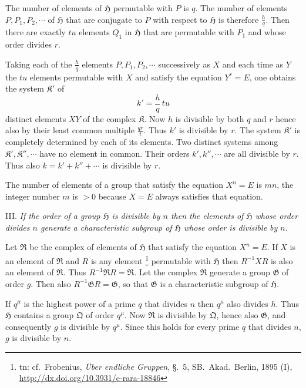 \documentclass[a5paper,12pt]{article}
\let\fr\mathfrak
\newcommand{\CG}{\fr{G}}
\newcommand{\CH}{\fr{H}}
\newcommand{\CK}{\fr{K}}
\newcommand{\CQ}{\fr{Q}}
\newcommand{\CR}{\fr{R}}
\newcommand{\?}{{\color{blue}${}^{(?)}$}}
\newcounter{origpagecounter}{}
\newcommand{\origpagebreak}{\mark{\arabic{origpagecounter}}\addtocounter{origpagecounter}{1}\mark{\arabic{origpagecounter}}}
\begin{document}
The number of elements of $\CH$
permutable with $P$ is $q$.
%
%
The number of elements $P, P_1, P_2, \cdots$
of $\CH$
that are conjugate to $P$
with respect to $\CH$
is therefore $\frac{h}{q}$.
%
%
Then there are exactly $t u$
elements $Q_1$ in $\CH$
that are permutable with $P_1$
and
whose order divides $r$.
%
%
\origpagebreak
%
%
Taking
each of the $\frac{h}{q}$ elements
$P, P_1, P_2, \cdots$
successively as $X$
and
each time
as $Y$
the $t u$ elements permutable with $X$
and
satisfy the equation $Y^r = E$,
one obtains
the system
$\CK'$
of %
\[
	k' = \frac{h}{q} \, t u
\]
distinct elements $X Y$ of the complex $\CK$.
%
%
Now $h$ is divisible
by both $q$ and $r$
hence
also by their
least common multiple $\frac{q r}{t}$.
%
%
Thus $k'$ is divisible by $r$.
%
%
The system $\CK'$
is completely determined
by each of its elements.
%
%
Two distinct systems
among $\CK', \CK'', \cdots$
have no element in common.
%
%
Their orders $k', k'', \cdots$
are all divisible by $r$.
%
%
Thus also $k = k' + k'' + \cdots$ is
divisible by $r$.


The number of elements of a group
that satisfy the equation $X^n = E$
is $m n$,
the integer number $m$ is $> 0$
because
$X = E$ always satisfies that equation.


III.
%
\label{t:2-3}
%
\emph{ %
If the order of a group $\CH$ is divisible by $n$
then
the elements of $\CH$
whose order divides $n$
generate
a characteristic subgroup
of $\CH$
whose order is divisible by $n$.
}


Let $\CR$ be the complex of elements of $\CH$
that satisfy the equation $X^n = E$.
%
%
If $X$ is an element of $\CR$
and $R$ is any element%
\footnote{%
	\scriptsize
	tn: cf.~Frobenius,
	\emph{\"Uber endliche Gruppen}, \S.~5,
	SB.~Akad.~Berlin,
	1895 (I),
	\href{http://dx.doi.org/10.3931/e-rara-18846}{http://dx.doi.org/10.3931/e-rara-18846}
}
permutable
with $\CH$
then
$R^{-1} X R$
is also an element of $\CR$.
%
%
Thus $R^{-1} \CR R = \CR$.
%
%
Let the complex $\CR$ generate a group $\CG$
of order $g$.
%
%
Then also $R^{-1} \CG R = \CG$,
so that
$\CG$ is a characteristic subgroup of $\CH$.


If $q^\mu$ is the highest power
of a prime $q$
that divides $n$
then $q^\mu$ also divides $h$.
%
%
Thus $\CH$ contains a group $\CQ$ of order $q^\mu$.
%
%
Now $\CR$ is divisible by $\CQ$,
hence also $\CG$,
and consequently
$g$ is divisible by $q^\mu$.
%
%
Since this holds for every prime $q$ that divides $n$,
$g$ is divisible by $n$.
\end{document}

